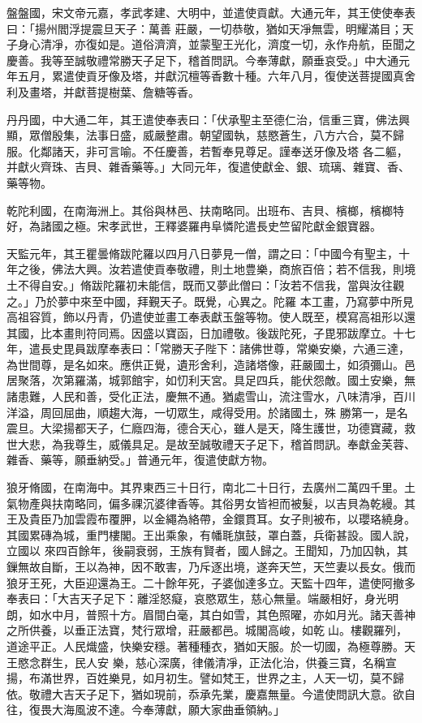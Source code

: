 \begin{pinyinscope}
 盤盤國，宋文帝元嘉，孝武孝建、大明中，並遣使貢獻。大通元年，其王使使奉表曰：「揚州閻浮提震旦天子：萬善
 莊嚴，一切恭敬，猶如天凈無雲，明耀滿目；天子身心清凈，亦復如是。道俗濟濟，並蒙聖王光化，濟度一切，永作舟航，臣聞之慶善。我等至誠敬禮常勝天子足下，稽首問訊。今奉薄獻，願垂哀受。」中大通元年五月，累遣使貢牙像及塔，并獻沉檀等香數十種。六年八月，復使送菩提國真舍利及畫塔，并獻菩提樹葉、詹糖等香。



 丹丹國，中大通二年，其王遣使奉表曰：「伏承聖主至德仁治，信重三寶，佛法興顯，眾僧殷集，法事日盛，威嚴整肅。朝望國執，慈愍蒼生，八方六合，莫不歸服。化鄰諸天，非可言喻。不任慶善，若暫奉見尊足。謹奉送牙像及塔
 各二軀，并獻火齊珠、吉貝、雜香藥等。」大同元年，復遣使獻金、銀、琉璃、雜寶、香、藥等物。



 乾陀利國，在南海洲上。其俗與林邑、扶南略同。出班布、吉貝、檳榔，檳榔特好，為諸國之極。宋孝武世，王釋婆羅冉阜憐陀遣長史竺留陀獻金銀寶器。



 天監元年，其王瞿曇脩跋陀羅以四月八日夢見一僧，謂之曰：「中國今有聖主，十年之後，佛法大興。汝若遣使貢奉敬禮，則土地豊樂，商旅百倍；若不信我，則境土不得自安。」脩跋陀羅初未能信，既而又夢此僧曰：「汝若不信我，當與汝往觀之。」乃於夢中來至中國，拜覲天子。既覺，心異之。陀羅
 本工畫，乃寫夢中所見高祖容質，飾以丹青，仍遣使並畫工奉表獻玉盤等物。使人既至，模寫高祖形以還其國，比本畫則符同焉。因盛以寶函，日加禮敬。後跋陀死，子毘邪跋摩立。十七年，遣長史毘員跋摩奉表曰：「常勝天子陛下：諸佛世尊，常樂安樂，六通三達，為世間尊，是名如來。應供正覺，遺形舍利，造諸塔像，莊嚴國土，如須彌山。邑居聚落，次第羅滿，城郭館宇，如忉利天宮。具足四兵，能伏怨敵。國土安樂，無諸患難，人民和善，受化正法，慶無不通。猶處雪山，流注雪水，八味清凈，百川洋溢，周回屈曲，順趨大海，一切眾生，咸得受用。於諸國土，殊
 勝第一，是名震旦。大梁揚都天子，仁廕四海，德合天心，雖人是天，降生護世，功德寶藏，救世大悲，為我尊生，威儀具足。是故至誠敬禮天子足下，稽首問訊。奉獻金芙蓉、雜香、藥等，願垂納受。」普通元年，復遣使獻方物。



 狼牙脩國，在南海中。其界東西三十日行，南北二十日行，去廣州二萬四千里。土氣物產與扶南略同，偏多祼沉婆律香等。其俗男女皆袒而被髮，以吉貝為乾縵。其王及貴臣乃加雲霞布覆胛，以金繩為絡帶，金鐶貫耳。女子則被布，以瓔珞繞身。其國累磚為城，重門樓閣。王出乘象，有幡毦旗鼓，罩白蓋，兵衛甚設。國人說，立國以
 來四百餘年，後嗣衰弱，王族有賢者，國人歸之。王聞知，乃加囚執，其鏁無故自斷，王以為神，因不敢害，乃斥逐出境，遂奔天竺，天竺妻以長女。俄而狼牙王死，大臣迎還為王。二十餘年死，子婆伽達多立。天監十四年，遣使阿撤多奉表曰：「大吉天子足下：離淫怒癡，哀愍眾生，慈心無量。端嚴相好，身光明朗，如水中月，普照十方。眉間白毫，其白如雪，其色照曜，亦如月光。諸天善神之所供養，以垂正法寶，梵行眾增，莊嚴都邑。城閣高峻，如乾山。樓觀羅列，道途平正。人民熾盛，快樂安穩。著種種衣，猶如天服。於一切國，為極尊勝。天王愍念群生，民人安
 樂，慈心深廣，律儀清凈，正法化治，供養三寶，名稱宣揚，布滿世界，百姓樂見，如月初生。譬如梵王，世界之主，人天一切，莫不歸依。敬禮大吉天子足下，猶如現前，忝承先業，慶嘉無量。今遣使問訊大意。欲自往，復畏大海風波不達。今奉薄獻，願大家曲垂領納。」




\end{pinyinscope}
